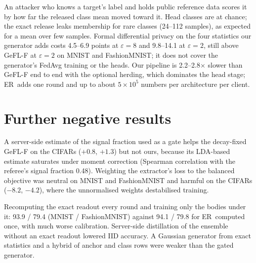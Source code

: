 \documentclass[10pt]{article}
\theoremstyle{plain}
\theoremstyle{definition}
\newcommand{\ER}{\textsc{ER}}
\begin{document}
An attacker who knows a target's label and holds public reference data scores it by how far the released class mean
moved toward it. Head classes are at chance; the exact release leaks membership for rare classes (24--112 samples), as
expected for a mean over few samples. Formal differential privacy on the four statistics our generator adds costs
4.5--6.9 points at $\varepsilon=8$ and 9.8--14.1 at $\varepsilon=2$, still above GeFL-F at $\varepsilon=2$ on MNIST and
FashionMNIST; it does not cover the generator's FedAvg training or the heads. Our pipeline is 2.2--2.8$\times$ slower
than GeFL-F end to end with the optional herding, which dominates the head stage; \ER\ adds one round and up to about $5\times10^5$ numbers per
architecture per client.

\section{Further negative results}\label{app:negative}

A server-side estimate of the signal fraction used as a gate helps the decay-fixed GeFL-F on the CIFARs ($+0.8$,
$+1.3$) but not ours, because its LDA-based estimate saturates under moment correction (Spearman correlation with the
referee's signal fraction 0.48). Weighting the extractor's loss to the balanced objective was neutral on MNIST and
FashionMNIST and harmful on the CIFARs ($-8.2$, $-4.2$), where the unnormalised weights destabilised training.

Recomputing the exact readout every round and training only the bodies under it: 93.9 / 79.4 (MNIST / FashionMNIST)
against 94.1 / 79.8 for \ER\ computed once, with much worse calibration. Server-side distillation of the ensemble
without an exact readout lowered IID accuracy. A Gaussian generator from exact statistics and a hybrid of anchor and
class rows were weaker than the gated generator.
\end{document}

